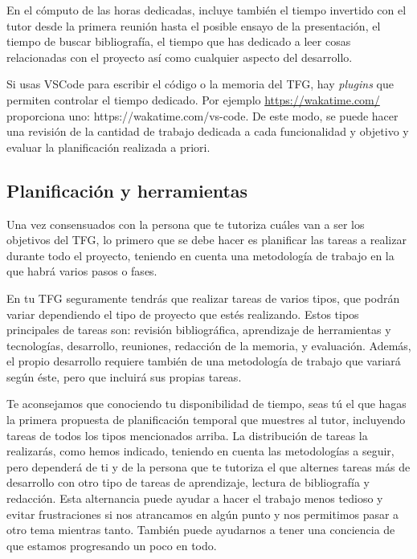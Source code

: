 En el cómputo de las horas dedicadas, incluye también el tiempo invertido con el tutor desde la primera reunión hasta el posible ensayo de la presentación, el tiempo de buscar bibliografía, el tiempo que has dedicado a leer cosas relacionadas con el proyecto así como cualquier aspecto del desarrollo.

Si usas VSCode para escribir el código o la memoria del TFG, hay {\it plugins} que permiten controlar el tiempo dedicado. Por ejemplo \url{https://wakatime.com/} proporciona uno: {https://wakatime.com/vs-code}. De este modo, se puede hacer una revisión de la cantidad de trabajo dedicada a cada funcionalidad y objetivo y evaluar la planificación realizada a priori.




\subsection{Planificación y herramientas} %
Una vez consensuados con la persona que te tutoriza cuáles van a ser los objetivos del TFG, lo primero que se debe hacer es planificar las tareas a realizar durante todo el proyecto, teniendo en cuenta una metodología de trabajo en la que habrá varios pasos o fases.

En tu TFG seguramente tendrás que realizar tareas de varios tipos, que podrán variar dependiendo el tipo de proyecto que estés realizando. Estos tipos principales de tareas son: revisión bibliográfica, aprendizaje de herramientas y tecnologías, desarrollo, reuniones, redacción de la memoria, y evaluación. Además, el propio desarrollo requiere también de una metodología de trabajo que variará según éste, pero que incluirá sus propias tareas.

Te aconsejamos que conociendo tu disponibilidad de tiempo, seas tú el que hagas la primera propuesta de planificación temporal que muestres al tutor, incluyendo tareas de todos los tipos mencionados arriba. La distribución de tareas la realizarás, como hemos indicado, teniendo en cuenta las metodologías a seguir, pero dependerá de ti y de la persona que te tutoriza el que alternes tareas más de desarrollo con otro tipo de tareas de aprendizaje, lectura de bibliografía y redacción. Esta alternancia puede ayudar a hacer el trabajo menos tedioso y evitar frustraciones si nos atrancamos en algún punto y nos permitimos pasar a otro tema mientras tanto. También puede ayudarnos a tener una conciencia de que estamos progresando un poco en todo. 

